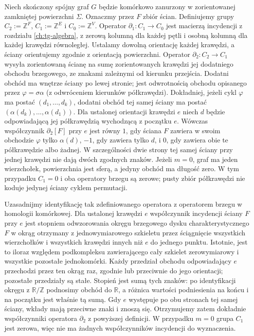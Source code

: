 \begin{definicja}
Niech skończony spójny graf $G$ będzie komórkowo zanurzony
w zorientowanej zamkniętej powierzchni $\Sigma$.
Oznaczmy przez $F$ zbiór ścian. Definiujemy grupy
$C_2:=\mathbb Z^F$, $C_1:=\mathbb Z^E$ i
$C_0:=\mathbb Z^V$. Operator $\partial_1:C_1\to C_0$
jest macierzą incydencji z rozdziału \ref{ch:tg-algebra},
z zerową kolumną dla każdej pętli i osobną kolumną
dla każdej krawędzi równoległej.
Ustalamy dowolną orientację każdej krawędzi, a ściany
orientujemy zgodnie z orientacją powierzchni.
Operator $\partial_2:C_2\to C_1$ wysyła zorientowaną
ścianę na sumę zorientowanych krawędzi jej dodatniego
obchodu brzegowego, ze znakami zależnymi od kierunku
przejścia. Dodatni obchód ma wnętrze ściany po lewej
stronie; jest odwrotnością obchodu opisanego przez
$\varphi=\sigma\alpha$ (z odwróceniem kierunków
półkrawędzi). Dokładniej, jeżeli cykl $\varphi$ ma postać
$(d_1,\ldots,d_k)$, dodatni obchód tej samej ściany
ma postać $(\alpha(d_k),\ldots,\alpha(d_1))$.
Dla ustalonej orientacji krawędzi $e$ niech $d$
będzie odpowiadającą jej półkrawędzią wychodzącą
z początku $e$. Wówczas współczynnik $\partial_2[F]$
przy $e$ jest równy $1$, gdy ściana $F$ zawiera
w swoim obchodzie $\varphi$ tylko $\alpha(d)$,
$-1$, gdy zawiera tylko $d$, i $0$, gdy zawiera
obie te półkrawędzie albo żadnej. W szczególności
dwie strony tej samej ściany przy jednej krawędzi
nie dają dwóch zgodnych znaków.
Jeżeli $m=0$, graf ma jeden wierzchołek, powierzchnia
jest sferą, a jedyny obchód ma długość zero. W tym przypadku
$C_1=0$ i oba operatory brzegu są zerowe; pusty zbiór
półkrawędzi nie koduje jedynej ściany cyklem permutacji.
\end{definicja}

Uzasadnijmy identyfikację tak zdefiniowanego operatora
z operatorem brzegu w homologii komórkowej.
Dla ustalonej krawędzi $e$ współczynnik incydencji
ściany $F$ przy $e$ jest stopniem odwzorowania
okręgu brzegowego dysku charakterystycznego $F$
w okrąg otrzymany z jednowymiarowego szkieletu
przez ściągnięcie wszystkich wierzchołków i wszystkich
krawędzi innych niż $e$ do jednego punktu.
Istotnie, jest to iloraz względem podkompleksu
zawierającego cały szkielet zerowymiarowy
i wszystkie pozostałe jednokomórki.
Każdy przedział obchodu odpowiadający $e$
przechodzi przez ten okrąg raz, zgodnie lub przeciwnie
do jego orientacji; pozostałe przedziały są stałe.
Stopień jest sumą tych znaków: po identyfikacji
okręgu z $\mathbb R/\mathbb Z$ podnosimy obchód
do $\mathbb R$, a różnica wartości podniesienia
na końcu i na początku jest właśnie tą sumą.
Gdy $e$ występuje po obu stronach tej samej ściany,
wkłady mają przeciwne znaki i znoszą się.
Otrzymujemy zatem dokładnie współczynniki
operatora $\partial_2$ z powyższej definicji.
W przypadku $m=0$ grupa $C_1$ jest zerowa,
więc nie ma żadnych współczynników incydencji
do wyznaczenia.


